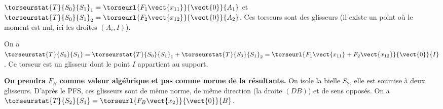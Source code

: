 \ifprof
\begin{corrige}
$\torseurstat{T}{S_0}{S_1}_1=\torseurl{F_1\vect{x_{11}}}{\vect{0}}{A_1}$
et 
$\torseurstat{T}{S_0}{S_1}_2=\torseurl{F_2\vect{x_{12}}}{\vect{0}}{A_2}$. 
Ces torseurs sont des glisseurs (il existe un point où le moment est nul, ici les droites $(A_i,I)$). 
\end{corrige}
\else
\fi

\ifnormal
{}
\else
\fi

\ifprof
\begin{corrige}
On a $\torseurstat{T}{S_0}{S_1}=\torseurstat{T}{S_0}{S_1}_1+\torseurstat{T}{S_0}{S_1}_2=\torseurl{F_1\vect{x_{11}}+F_2\vect{x_{12}}}{\vect{0}}{I}$. Ce torseur est un glisseur dont le point $I$ appartient au support. 
\end{corrige}
\else
\fi

\ifnormal
{}
\else
\fi


\ifprof
\begin{corrige}
\textbf{On prendra $F_B$ comme valeur algébrique et pas comme norme de la résultante.}
On isole la bielle $S_2$, elle est soumise à deux glisseurs. D'après le PFS, ces glisseurs sont de même norme, de même direction  (la droite $(DB)$) et de sens opposés. 
On a $\torseurstat{T}{S_2}{S_1}=\torseurl{ F_B\vect{x_{2}}}{\vect{0}}{B}$.
\end{corrige}
\else
\fi


\ifnormal
{}
\else
\fi

